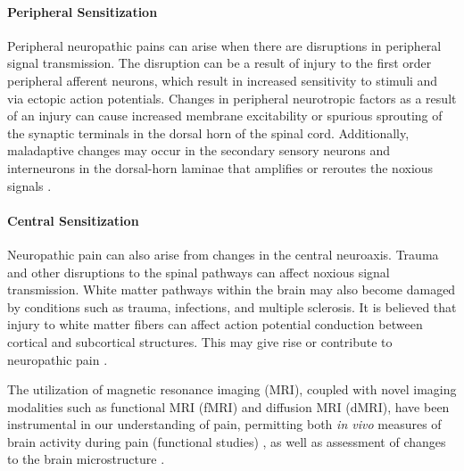 \paragraph{Peripheral Sensitization}

Peripheral neuropathic pains can arise when there are disruptions in peripheral signal transmission. The disruption can be a result of injury to the first order peripheral afferent neurons, which result in increased sensitivity to stimuli and via ectopic action potentials. Changes in peripheral neurotropic factors as a result of an injury can cause increased membrane excitability or spurious sprouting of the synaptic terminals in the dorsal horn of the spinal cord. Additionally, maladaptive changes may occur in the secondary sensory neurons and interneurons in the dorsal-horn laminae that amplifies or reroutes the noxious signals \cite{Elmes2004}.

\paragraph{Central Sensitization}

Neuropathic pain can also arise from changes in the central neuroaxis. Trauma and other disruptions to the spinal pathways can affect noxious signal transmission. White matter pathways within the brain may also become damaged by conditions such as trauma, infections, and multiple sclerosis. It is believed that injury to white matter fibers can affect action potential conduction between cortical and subcortical structures. This may give rise or contribute to neuropathic pain \cite{Geha2008}.

 The utilization of magnetic resonance imaging (MRI), coupled with novel imaging modalities such as functional MRI (fMRI) and diffusion MRI (dMRI), have been instrumental in our understanding of pain, permitting both \textit{in vivo} measures of brain activity during pain (functional studies) \cite{Davis2006}, as well as assessment of changes to the brain microstructure \cite{Hodaie2009a,Chen2015c}.
 
